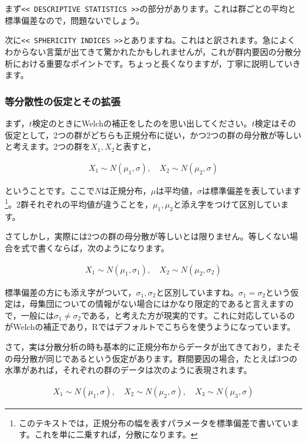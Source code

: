 \documentclass{ltjbook}
\begin{document}
まず\verb|<< DESCRIPTIVE STATISTICS >>|の部分があります。これは群ごとの平均と標準偏差なので，問題ないでしょう。

次に\verb|<< SPHERICITY INDICES >>|とありますね。これはと訳されます。急によくわからない言葉が出てきて驚かれたかもしれませんが，これが群内要因の分散分析における重要なポイントです。ちょっと長くなりますが，丁寧に説明していきます。
\subsubsection{等分散性の仮定とその拡張}
まず，$t$検定のときにWelchの補正をしたのを思い出してください。$t$検定はその仮定として，2つの群がどちらも正規分布に従い，かつ2つの群の母分散が等しいと考えます。2つの群を$X_1,X_2$と表すと，

\begin{align}
X_1 \sim N(\mu_1, \sigma), \quad X_2 \sim N(\mu_2, \sigma)
\end{align}

ということです。ここで$N$は正規分布，$\mu$は平均値，$\sigma$は標準偏差を表しています\footnote{このテキストでは，正規分布の幅を表すパラメータを標準偏差で書いています。これを単に二乗すれば，分散になります。}。2群それぞれの平均値が違うことを，$\mu_1,\mu_2$と添え字をつけて区別しています。

さてしかし，実際には2つの群の母分散が等しいとは限りません。等しくない場合を式で書くならば，次のようになります。

\begin{align}
X_1 \sim N(\mu_1, \sigma_1), \quad X_2 \sim N(\mu_2, \sigma_2)
\end{align}

標準偏差の方にも添え字がついて，$\sigma_1,\sigma_2$と区別していますね。$\sigma_1 = \sigma_2$という仮定は，母集団についての情報がない場合にはかなり限定的であると言えますので，一般には$\sigma_1 \ne \sigma_2$である，と考えた方が現実的です。これに対応しているのがWelchの補正であり，Rではデフォルトでこちらを使うようになっています。

さて，実は分散分析の時も基本的に正規分布からデータが出てきており，またその母分散が同じであるという仮定があります。群間要因の場合，たとえば3つの水準があれば，それぞれの群のデータは次のように表現されます。

\begin{align}
X_1 \sim N(\mu_1, \sigma), \quad X_2 \sim N(\mu_2, \sigma), \quad X_3 \sim N(\mu_3, \sigma)
\end{align}
\end{document}

